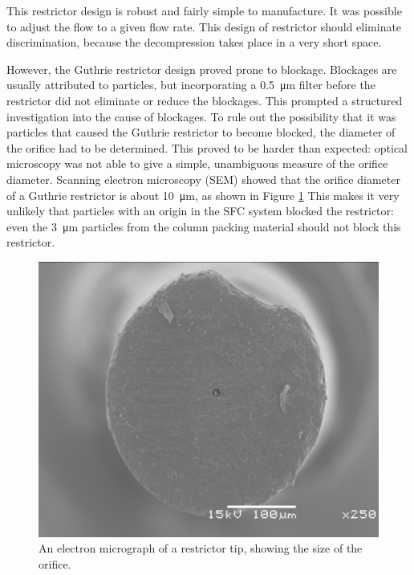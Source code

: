 This restrictor design is robust and fairly simple to manufacture. It was
possible to adjust the flow to a given flow rate. This design of restrictor
should eliminate discrimination, because the decompression takes place in a very
short space.

However, the Guthrie restrictor design proved prone to blockage. Blockages are
usually attributed to particles, but incorporating a \SI{0.5}{\micro\metre}
filter before the restrictor did not eliminate or reduce the blockages.
This prompted a structured investigation into the cause of blockages. To rule
out the possibility that it was particles that caused the Guthrie restrictor to
become blocked, the diameter of the orifice had to be determined. This
proved to be harder than expected: optical microscopy was not able to give a
simple, unambiguous measure of the orifice diameter. Scanning electron
microscopy (SEM) showed that the orifice diameter of a Guthrie restrictor is
about \SI{10}{\micro\meter}, as shown in Figure \ref{fig:restrictororifice} This
makes it very unlikely that particles with an origin in the SFC system blocked
the restrictor: even the \SI{3}{\micro\meter} particles from the column packing
material should not block this restrictor.

\begin{figure}
\centering
\includegraphics[width=\textwidth]{Figures/sem_h_001.png}
\decoRule

\caption[A electron microscope photo of a restrictor orifice]{An electron
micrograph of a restrictor tip, showing the size of the orifice.}

\label{fig:restrictororifice}
\end{figure}

